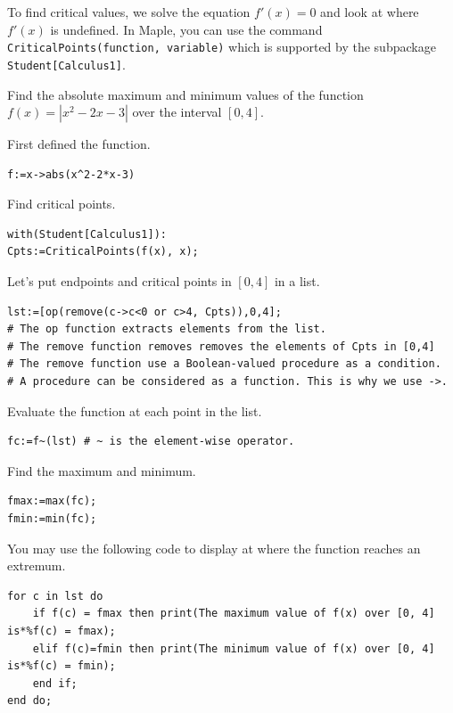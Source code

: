 \documentclass[en,11pt,simple]{elegantbook}
\let\BeginKnitrBlock\begin \let\EndKnitrBlock\end
\begin{document}
To find critical values, we solve the equation \(f'(x)=0\) and look at where \(f'(x)\) is undefined. In Maple, you can use the command \texttt{CriticalPoints(function,\ variable)} which is supported by the subpackage \texttt{Student{[}Calculus1{]}}.

\BeginKnitrBlock{example}{}{}
\protect\hypertarget{exm:unnamed-chunk-91}{}{\label{exm:unnamed-chunk-91} }
Find the absolute maximum and minimum values of the function \(f(x)=|x^2-2x-3|\) over the interval \([0, 4]\).
\EndKnitrBlock{example}

\BeginKnitrBlock{solution}{}{}
{}
First defined the function.

\begin{verbatim}
f:=x->abs(x^2-2*x-3)
\end{verbatim}

Find critical points.

\begin{verbatim}
with(Student[Calculus1]):
Cpts:=CriticalPoints(f(x), x);
\end{verbatim}

Let's put endpoints and critical points in \([0,4]\) in a list.

\begin{verbatim}
lst:=[op(remove(c->c<0 or c>4, Cpts)),0,4];
# The op function extracts elements from the list.
# The remove function removes removes the elements of Cpts in [0,4]
# The remove function use a Boolean-valued procedure as a condition.
# A procedure can be considered as a function. This is why we use ->. 
\end{verbatim}

Evaluate the function at each point in the list.

\begin{verbatim}
fc:=f~(lst) # ~ is the element-wise operator.
\end{verbatim}

Find the maximum and minimum.

\begin{verbatim}
fmax:=max(fc);
fmin:=min(fc);
\end{verbatim}

You may use the following code to display at where the function reaches an extremum.

\begin{verbatim}
for c in lst do
    if f(c) = fmax then print(The maximum value of f(x) over [0, 4] is*%f(c) = fmax);
    elif f(c)=fmin then print(The minimum value of f(x) over [0, 4] is*%f(c) = fmin);
    end if;
end do;
\end{verbatim}
\EndKnitrBlock{solution}
\end{document}
